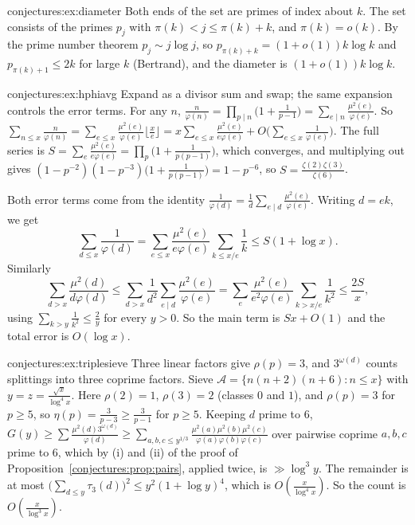 \begin{solution}{conjectures:ex:diameter}
\idea Both ends of the set are primes of index about $k$.
\writeup The set consists of the primes $p_{j}$ with $\pi(k)<j\le\pi(k)+k$, and $\pi(k)=o(k)$. By the prime number theorem $p_j\sim j\log j$, so
$p_{\pi(k)+k}=(1+o(1))k\log k$ and $p_{\pi(k)+1}\le2k$ for large $k$ (Bertrand), and the diameter is $(1+o(1))k\log k$.
\end{solution}

\begin{solution}{conjectures:ex:hphiavg}
\idea Expand as a divisor sum and swap; the same expansion controls the error terms.
\writeup For any $n$, $\frac n{\varphi(n)}=\prod_{p\mid n}\bigl(1+\frac1{p-1}\bigr)=\sum_{e\mid n}\frac{\mu^2(e)}{\varphi(e)}$. So
$\sum_{n\le x}\frac n{\varphi(n)}=\sum_{e\le x}\frac{\mu^2(e)}{\varphi(e)}\lfloor\frac xe\rfloor=x\sum_{e\le x}\frac{\mu^2(e)}{e\varphi(e)}+O\bigl(\sum_{e\le x}\frac1{\varphi(e)}\bigr)$.
The full series is $S=\sum_e\frac{\mu^2(e)}{e\varphi(e)}=\prod_p\bigl(1+\frac1{p(p-1)}\bigr)$, which converges, and multiplying out gives
$(1-p^{-2})(1-p^{-3})\bigl(1+\frac1{p(p-1)}\bigr)=1-p^{-6}$, so $S=\frac{\zeta(2)\zeta(3)}{\zeta(6)}$.

Both error terms come from the identity $\frac1{\varphi(d)}=\frac1d\sum_{e\mid d}\frac{\mu^2(e)}{\varphi(e)}$. Writing $d=ek$, we get
\[
\sum_{d\le x}\frac1{\varphi(d)}=\sum_{e\le x}\frac{\mu^2(e)}{e\varphi(e)}\sum_{k\le x/e}\frac1k\le S(1+\log x).
\]
Similarly
\[
\sum_{d>x}\frac{\mu^2(d)}{d\varphi(d)}\le\sum_{d>x}\frac1{d^2}\sum_{e\mid d}\frac{\mu^2(e)}{\varphi(e)}=\sum_e\frac{\mu^2(e)}{e^2\varphi(e)}\sum_{k>x/e}\frac1{k^2}\le\frac{2S}x,
\]
using $\sum_{k>y}\frac1{k^2}\le\frac2y$ for every $y>0$. So the main term is $Sx+O(1)$ and the total error is $O(\log x)$.
\end{solution}

\begin{solution}{conjectures:ex:triplesieve}
\idea Three linear factors give $\rho(p)=3$, and $3^{\omega(d)}$ counts splittings into three coprime factors.
\writeup Sieve $\mathcal A=\{n(n+2)(n+6):n\le x\}$ with $y=z=\frac{\sqrt x}{\log^4x}$. Here $\rho(2)=1$, $\rho(3)=2$ (classes $0$ and $1$), and $\rho(p)=3$ for
$p\ge5$, so $\eta(p)=\frac3{p-3}\ge\frac3{p-1}$ for $p\ge5$. Keeping $d$ prime to $6$, $G(y)\ge\sum\frac{\mu^2(d)3^{\omega(d)}}{\varphi(d)}\ge\sum_{a,b,c\le y^{1/3}}\frac{\mu^2(a)\mu^2(b)\mu^2(c)}{\varphi(a)\varphi(b)\varphi(c)}$
over pairwise coprime $a,b,c$ prime to $6$, which by (i) and (ii) of the proof of Proposition~\ref{conjectures:prop:pairs}, applied twice, is $\gg\log^3y$. The
remainder is at most $\bigl(\sum_{d\le y}\tau_3(d)\bigr)^2\le y^2(1+\log y)^4$, which is $O(\frac x{\log^4x})$. So the count is $O(\frac x{\log^3x})$.
\end{solution}

